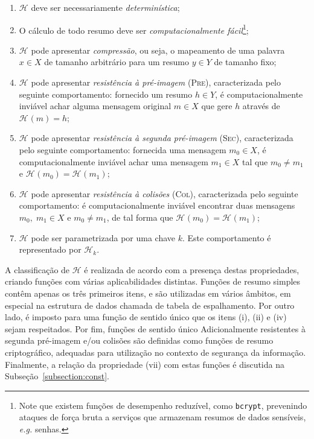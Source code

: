 \documentclass{ufsctex/ufsctex}
\newcommand{\hh}{\mathcal{H}}
\newcommand{\hash}[2][]{\mathcal{H}^{#1} (#2)}
\begin{document}
\begin{enumerate}[label= (\roman*)]

  \item $\hh{}$ deve ser necessariamente \emph{determinística};

  \item O cálculo de todo resumo deve ser \emph{computacionalmente
      fácil}\footnote{Note que existem funções de desempenho reduzível, como
        \texttt{bcrypt}, prevenindo ataques de força bruta a serviços que
        armazenam resumos de dados sensíveis, \emph{e.g.} senhas.};

  \item $\hh{}$ pode apresentar \emph{compressão}, ou seja, o mapeamento de uma
      palavra $x \in X$ de tamanho arbitrário para um resumo $y \in Y$ de
        tamanho fixo;

  \item $\hh{}$ pode apresentar \emph{resistência à pré-imagem} (\textsc{Pre}),
      caracterizada pelo seguinte comportamento: fornecido um resumo $h \in Y$,
        é computacionalmente inviável achar alguma mensagem original $m \in X$
        que gere $h$ através de $\hash{m} = h$;

  \item $\hh{}$ pode apresentar \emph{resistência à segunda pré-imagem}
      (\textsc{Sec}), caracterizada pelo seguinte comportamento: fornecida uma
        mensagem $m_{0} \in X$, é computacionalmente inviável achar uma
        mensagem $m_{1} \in X$ tal que $m_{0} \neq m_{1}$ e $\hash{m_{0}} =
        \hash{m_{1}}$;

  \item $\hh{}$ pode apresentar \emph{resistência à colisões} (\textsc{Col}),
      caracterizada pelo seguinte comportamento: é computacionalmente inviável
        encontrar duas mensagens $m_{0}, \; m_{1} \in X$ e $m_{0} \neq m_{1}$,
        de tal forma que $\hash{m_{0}} = \hash{m_{1}}$;

  \item $\hh{}$ pode ser parametrizada por uma chave $k$. Este comportamento é
      representado por $\hh{}_{k}$.

\end{enumerate}

A classificação de $\hh{}$ é realizada de acordo com a presença destas
propriedades, criando funções com várias aplicabilidades distintas. Funções de
resumo simples contêm apenas os três primeiros itens, e são utilizadas em
vários âmbitos, em especial na estrutura de dados chamada de tabela de
espalhamento. Por outro lado, é imposto para uma função de sentido único que os
itens (i), (ii) e (iv) sejam respeitados. Por fim, funções de sentido único
Adicionalmente resistentes à segunda pré-imagem e/ou colisões são definidas
como funções de resumo criptográfico, adequadas para utilização no contexto de
segurança da informação. Finalmente, a relação da propriedade (vii) com estas
funções é discutida na Subseção~\ref{subsection:const}.
\end{document}
